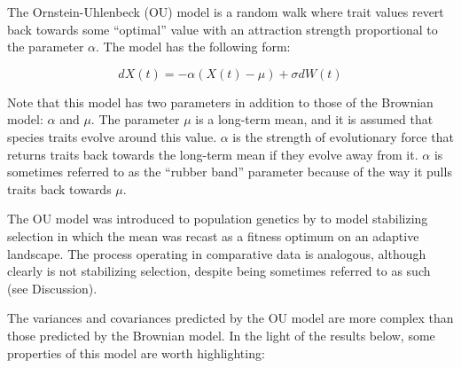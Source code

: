 \documentclass[a4paper,12pt]{article}
\begin{document}
The Ornstein-Uhlenbeck (OU) model \citep{hansen1997stabilizing,Butler:2004aa} is a random walk where trait values revert back towards some ``optimal'' value with an attraction strength proportional to the parameter $\alpha$. The model has the following form:
  
  \begin{equation}
    dX(t) = - \alpha (X(t) - \mu) + \sigma dW(t)
    \label{equation:OUrate} 
  \end{equation}

Note that this model has two parameters in addition to those of the Brownian model: $\alpha$ and $\mu$. The parameter $\mu$ is a long-term mean, and it is assumed that species traits evolve around this value. $\alpha$ is the strength of evolutionary force that returns traits back towards the long-term mean if they evolve away from it. $\alpha$ is sometimes referred to as the ``rubber band'' parameter because of the way it pulls traits back towards $\mu$.

The OU model was introduced to population genetics by \cite{Lande:1976aa} to model stabilizing selection in which the mean was recast as a fitness optimum on an adaptive landscape. The process operating in comparative data is analogous, although clearly is not stabilizing selection, despite being sometimes referred to as such (see Discussion). 

The variances and covariances predicted by the OU model are more complex than those predicted by the Brownian model. In the light of the results below, some properties of this model are worth highlighting:
\end{document}
